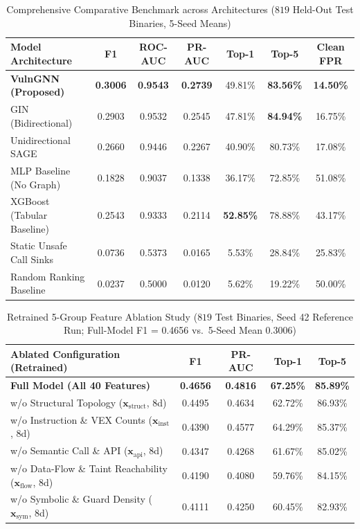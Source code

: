 \documentclass[10pt,conference]{IEEEtran}
\begin{document}
\begin{table}[!t]
\caption{Comprehensive Comparative Benchmark across Architectures ($819$ Held-Out Test Binaries, 5-Seed Means)}
\label{tab:baselines}
\renewcommand{\arraystretch}{1.0}
\footnotesize
\setlength\tabcolsep{2.0pt}
\begin{tabular}{lcccccc}
\toprule
\textbf{Model Architecture} & \textbf{F1} & \textbf{ROC-AUC} & \textbf{PR-AUC} & \textbf{Top-1} & \textbf{Top-5} & \textbf{Clean FPR} \\
\midrule
\textbf{VulnGNN (Proposed)}     & \textbf{0.3006} & \textbf{0.9543} & \textbf{0.2739} & 49.81\% & \textbf{83.56\%} & \textbf{14.50\%} \\
GIN (Bidirectional)~\cite{xu2018gin}& 0.2903 & 0.9532 & 0.2545 & 47.81\% & \textbf{84.94\%} & 16.75\% \\
Unidirectional SAGE             & 0.2660 & 0.9446 & 0.2267 & 40.90\% & 80.73\% & 17.08\% \\
MLP Baseline (No Graph)         & 0.1828 & 0.9037 & 0.1338 & 36.17\% & 72.85\% & 51.08\% \\
XGBoost (Tabular Baseline)      & 0.2543 & 0.9333 & 0.2114 & \textbf{52.85\%} & 78.88\% & 43.17\% \\
Static Unsafe Call Sinks        & 0.0736 & 0.5373 & 0.0165 & 5.53\%  & 28.84\% & 25.83\% \\
Random Ranking Baseline         & 0.0237 & 0.5000 & 0.0120 & 5.62\%  & 19.22\% & 50.00\% \\
\bottomrule
\end{tabular}
\end{table}

\begin{table}[!t]
\caption{Retrained 5-Group Feature Ablation Study ($819$ Test Binaries, Seed 42 Reference Run; Full-Model F1 = 0.4656 vs.\ 5-Seed Mean 0.3006)}
\label{tab:ablation}
\renewcommand{\arraystretch}{1.0}
\footnotesize
\setlength\tabcolsep{3pt}
\begin{tabular}{lcccc}
\toprule
\textbf{Ablated Configuration (Retrained)} & \textbf{F1} & \textbf{PR-AUC} & \textbf{Top-1} & \textbf{Top-5} \\
\midrule
\textbf{Full Model (All 40 Features)}          & \textbf{0.4656} & \textbf{0.4816} & \textbf{67.25\%} & \textbf{85.89\%} \\
w/o Structural Topology ($\mathbf{x}_{\text{struct}}$, 8d) & 0.4495 & 0.4634 & 62.72\% & 86.93\% \\
w/o Instruction \& VEX Counts ($\mathbf{x}_{\text{inst}}$, 8d) & 0.4390 & 0.4577 & 64.29\% & 85.37\% \\
w/o Semantic Call \& API ($\mathbf{x}_{\text{api}}$, 8d) & 0.4347 & 0.4268 & 61.67\% & 85.02\% \\
w/o Data-Flow \& Taint Reachability ($\mathbf{x}_{\text{flow}}$, 8d) & 0.4190 & 0.4080 & 59.76\% & 84.15\% \\
w/o Symbolic \& Guard Density ($\mathbf{x}_{\text{sym}}$, 8d) & 0.4111 & 0.4250 & 60.45\% & 82.93\% \\
\bottomrule
\end{tabular}
\end{table}
\end{document}
